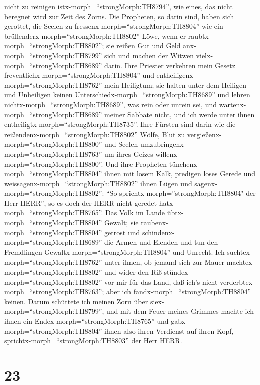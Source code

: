 nicht zu reinigen istx-morph=``strongMorph:TH8794'', wie eines, das
nicht beregnet wird zur Zeit des Zorns.  Die Propheten, so
darin sind, haben sich gerottet, die Seelen zu
fressenx-morph=``strongMorph:TH8804'' wie ein
brüllenderx-morph=``strongMorph:TH8802'' Löwe, wenn er
raubtx-morph=``strongMorph:TH8802''; sie reißen Gut und Geld
anx-morph=``strongMorph:TH8799'' sich und machen der Witwen
vielx-morph=``strongMorph:TH8689'' darin.  Ihre Priester
verkehren mein Gesetz freventlichx-morph=``strongMorph:TH8804'' und
entheiligenx-morph=``strongMorph:TH8762'' mein Heiligtum; sie halten
unter dem Heiligen und Unheiligen keinen
Unterschiedx-morph=``strongMorph:TH8689'' und lehren
nichtx-morph=``strongMorph:TH8689'', was rein oder unrein sei, und
wartenx-morph=``strongMorph:TH8689'' meiner Sabbate nicht, und ich werde
unter ihnen entheiligtx-morph=``strongMorph:TH8735''.  Ihre
Fürsten sind darin wie die reißendenx-morph=``strongMorph:TH8802''
Wölfe, Blut zu vergießenx-morph=``strongMorph:TH8800'' und Seelen
umzubringenx-morph=``strongMorph:TH8763'' um ihres Geizes
willenx-morph=``strongMorph:TH8800''.  Und ihre Propheten
tünchenx-morph=``strongMorph:TH8804'' ihnen mit losem Kalk, predigen
loses Gerede und weissagenx-morph=``strongMorph:TH8802'' ihnen Lügen und
sagenx-morph=``strongMorph:TH8802'': ``So
sprichtx-morph=''strongMorph:TH8804" der Herr HERR'', so es doch der
HERR nicht geredet hatx-morph=``strongMorph:TH8765''.  Das
Volk im Lande übtx-morph=``strongMorph:TH8804'' Gewalt; sie
raubenx-morph=``strongMorph:TH8804'' getrost und
schindenx-morph=``strongMorph:TH8689'' die Armen und Elenden und tun den
Fremdlingen Gewaltx-morph=``strongMorph:TH8804'' und Unrecht.
 Ich suchtex-morph=``strongMorph:TH8762'' unter ihnen, ob
jemand sich zur Mauer machtex-morph=``strongMorph:TH8802'' und wider den
Riß stündex-morph=``strongMorph:TH8802'' vor mir für das Land, daß ich's
nicht verderbtex-morph=``strongMorph:TH8763''; aber ich
fandx-morph=``strongMorph:TH8804'' keinen.  Darum schüttete
ich meinen Zorn über siex-morph=``strongMorph:TH8799'', und mit dem
Feuer meines Grimmes machte ich ihnen ein
Endex-morph=``strongMorph:TH8765'' und gabx-morph=``strongMorph:TH8804''
ihnen also ihren Verdienst auf ihren Kopf,
sprichtx-morph=``strongMorph:TH8803'' der Herr HERR.

\hypertarget{section-22}{%
\section{23}\label{section-22}}

